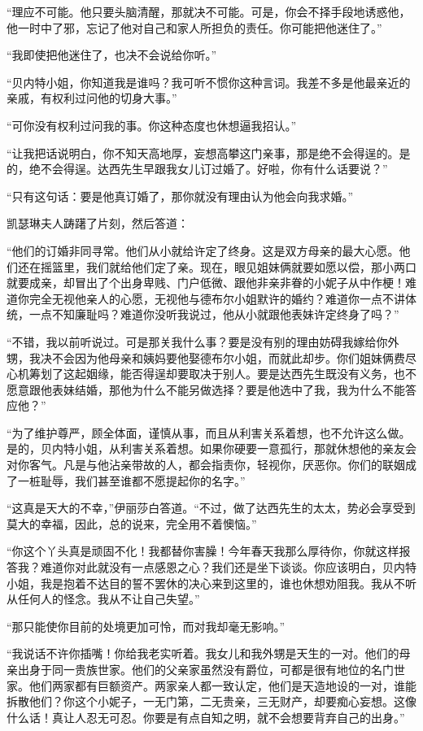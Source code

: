 \par “理应不可能。他只要头脑清醒，那就决不可能。可是，你会不择手段地诱惑他，他一时中了邪，忘记了他对自己和家人所担负的责任。你可能把他迷住了。”
\par “我即使把他迷住了，也决不会说给你听。”
\par “贝内特小姐，你知道我是谁吗？我可听不惯你这种言词。我差不多是他最亲近的亲戚，有权利过问他的切身大事。”
\par “可你没有权利过问我的事。你这种态度也休想逼我招认。”
\par “让我把话说明白，你不知天高地厚，妄想高攀这门亲事，那是绝不会得逞的。是的，绝不会得逞。达西先生早跟我女儿订过婚了。好啦，你有什么话要说？”
\par “只有这句话：要是他真订婚了，那你就没有理由认为他会向我求婚。”
\par 凯瑟琳夫人踌躇了片刻，然后答道：
\par “他们的订婚非同寻常。他们从小就给许定了终身。这是双方母亲的最大心愿。他们还在摇篮里，我们就给他们定了亲。现在，眼见姐妹俩就要如愿以偿，那小两口就要成亲，却冒出了个出身卑贱、门户低微、跟他非亲非眷的小妮子从中作梗！难道你完全无视他亲人的心愿，无视他与德布尔小姐默许的婚约？难道你一点不讲体统，一点不知廉耻吗？难道你没听我说过，他从小就跟他表妹许定终身了吗？”
\par “不错，我以前听说过。可是那关我什么事？要是没有别的理由妨碍我嫁给你外甥，我决不会因为他母亲和姨妈要他娶德布尔小姐，而就此却步。你们姐妹俩费尽心机筹划了这起姻缘，能否得逞却要取决于别人。要是达西先生既没有义务，也不愿意跟他表妹结婚，那他为什么不能另做选择？要是他选中了我，我为什么不能答应他？”
\par “为了维护尊严，顾全体面，谨慎从事，而且从利害关系着想，也不允许这么做。是的，贝内特小姐，从利害关系着想。如果你硬要一意孤行，那就休想他的亲友会对你客气。凡是与他沾亲带故的人，都会指责你，轻视你，厌恶你。你们的联姻成了一桩耻辱，我们甚至谁都不愿提起你的名字。”
\par “这真是天大的不幸，”伊丽莎白答道。“不过，做了达西先生的太太，势必会享受到莫大的幸福，因此，总的说来，完全用不着懊恼。”
\par “你这个丫头真是顽固不化！我都替你害臊！今年春天我那么厚待你，你就这样报答我？难道你对此就没有一点感恩之心？我们还是坐下谈谈。你应该明白，贝内特小姐，我是抱着不达目的誓不罢休的决心来到这里的，谁也休想劝阻我。我从不听从任何人的怪念。我从不让自己失望。”
\par “那只能使你目前的处境更加可怜，而对我却毫无影响。”
\par “我说话不许你插嘴！你给我老实听着。我女儿和我外甥是天生的一对。他们的母亲出身于同一贵族世家。他们的父亲家虽然没有爵位，可都是很有地位的名门世家。他们两家都有巨额资产。两家亲人都一致认定，他们是天造地设的一对，谁能拆散他们？你这个小妮子，一无门第，二无贵亲，三无财产，却要痴心妄想。这像什么话！真让人忍无可忍。你要是有点自知之明，就不会想要背弃自己的出身。”
